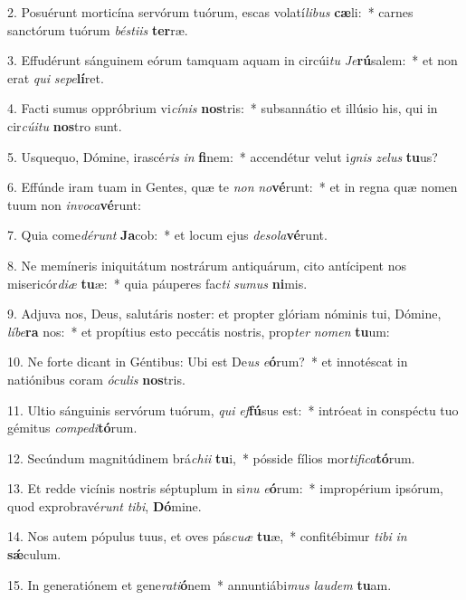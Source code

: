 2. Posuérunt morticína servórum tuórum, escas volatí\textit{li}\textit{bus} \textbf{cæ}li:~*  carnes sanctórum tuórum \textit{bés}\textit{ti}\textit{is} \textbf{ter}ræ.\

3. Effudérunt sánguinem eórum tamquam aquam in circúi\textit{tu} \textit{Je}\textbf{rú}salem:~*  et non erat \textit{qui} \textit{se}\textit{pe}\textbf{lí}ret.\

4. Facti sumus oppróbrium vi\textit{cí}\textit{nis} \textbf{nos}tris:~*  subsannátio et illúsio his, qui in cir\textit{cú}\textit{i}\textit{tu} \textbf{nos}tro sunt.\

5. Usquequo, Dómine, irascé\textit{ris} \textit{in} \textbf{fi}nem:~*  accendétur velut i\textit{gnis} \textit{ze}\textit{lus} \textbf{tu}us?\

6. Effúnde iram tuam in Gentes, quæ te \textit{non} \textit{no}\textbf{vé}runt:~*  et in regna quæ nomen tuum non \textit{in}\textit{vo}\textit{ca}\textbf{vé}runt:\

7. Quia come\textit{dé}\textit{runt} \textbf{Ja}cob:~*  et locum ejus \textit{de}\textit{so}\textit{la}\textbf{vé}runt.\

8. Ne memíneris iniquitátum nostrárum antiquárum, cito antícipent nos misericór\textit{di}\textit{æ} \textbf{tu}æ:~*  quia páuperes fac\textit{ti} \textit{su}\textit{mus} \textbf{ni}mis.\

9. Adjuva nos, Deus, salutáris noster: et propter glóriam nóminis tui, Dómine, \textit{lí}\textit{be}\textbf{ra} nos:~*  et propítius esto peccátis nostris, prop\textit{ter} \textit{no}\textit{men} \textbf{tu}um:\

10. Ne forte dicant in Géntibus: Ubi est De\textit{us} \textit{e}\textbf{ó}rum?~*  et innotéscat in natiónibus coram \textit{ó}\textit{cu}\textit{lis} \textbf{nos}tris.\

11. Ultio sánguinis servórum tuórum, \textit{qui} \textit{ef}\textbf{fú}sus est:~*  intróeat in conspéctu tuo gémitus \textit{com}\textit{pe}\textit{di}\textbf{tó}rum.\

12. Secúndum magnitúdinem brá\textit{chi}\textit{i} \textbf{tu}i,~*  pósside fílios mor\textit{ti}\textit{fi}\textit{ca}\textbf{tó}rum.\

13. Et redde vicínis nostris séptuplum in si\textit{nu} \textit{e}\textbf{ó}rum:~*  impropérium ipsórum, quod exprobravé\textit{runt} \textit{ti}\textit{bi}, \textbf{Dó}mine.\

14. Nos autem pópulus tuus, et oves pás\textit{cu}\textit{æ} \textbf{tu}æ,~*  confitébimur \textit{ti}\textit{bi} \textit{in} \textbf{sǽ}culum.\

15. In generatiónem et gene\textit{ra}\textit{ti}\textbf{ó}nem~*  annuntiábi\textit{mus} \textit{lau}\textit{dem} \textbf{tu}am.\

